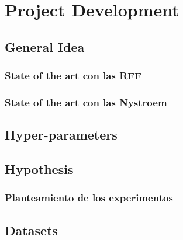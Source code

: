
\chapter{Project Development} %

\label{Chapter3} %


\section{General Idea}
  \subsection{State of the art con las RFF}
  \subsection{State of the art con las Nystroem}

\section{Hyper-parameters}
\section{Hypothesis}
  \subsection{Planteamiento de los experimentos}

\section{Datasets}
